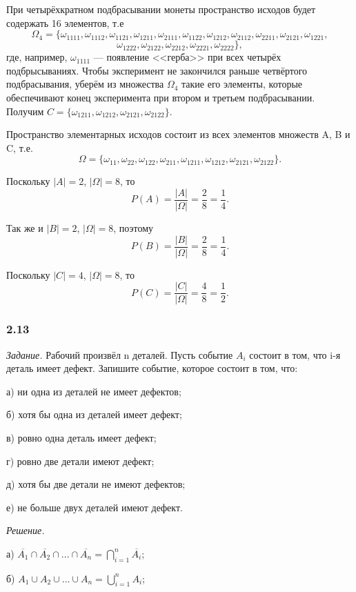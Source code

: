\documentclass{book}
\begin{document}
При четырёхкратном подбрасывании монеты пространство исходов будет содержать 16 элементов, т.е $$\Omega_4=\{\omega_{1111}, \omega_{1112}, \omega_{1121}, \omega_{1211}, \omega_{2111}, \omega_{1122}, \omega_{1212}, \omega_{2112}, \omega_{2211}, \omega_{2121}, \omega_{1221},$$$$\omega_{1222}, \omega_{2122}, \omega_{2212}, \omega_{2221}, \omega_{2222}\},$$ где, например, $\omega_{1111}$ --- появление <<герба>> при всех четырёх подбрысываниях. Чтобы эксперимент не закончился раньше четвёртого подбрасывания, уберём из множества $\Omega_4$ такие его элементы, которые обеспечивают конец эксперимента при втором и третьем подбрасывании. Получим $C=\{\omega_{1211}, \omega_{1212}, \omega_{2121}, \omega_{2122}\}$.

Пространство элементарных исходов состоит из всех элементов множеств A, B и C, т.е. $$\Omega=\{\omega_{11}, \omega_{22}, \omega_{122}, \omega_{211}, \omega_{1211}, \omega_{1212}, \omega_{2121}, \omega_{2122}\}.$$

Поскольку $|A|=2$, $|\Omega|=8$, то $$P(A)=\frac{|A|}{|\Omega|}=\frac{2}{8}=\frac{1}{4}.$$

Так же и $|B|=2$, $|\Omega|=8$, поэтому $$P(B)=\frac{|B|}{|\Omega|}=\frac{2}{8}=\frac{1}{4}.$$

Поскольку $|C|=4$, $|\Omega|=8$, то $$P(C)=\frac{|C|}{|\Omega|}=\frac{4}{8}=\frac{1}{2}.$$

\subsubsection*{2.13}

\textit{Задание.} Рабочий произвёл n деталей. Пусть событие $A_i$ состоит в том, что i-я деталь имеет дефект. Запишите событие, которое состоит в том, что:

а) ни одна из деталей не имеет дефектов;

б) хотя бы одна из деталей имеет дефект;

в) ровно одна деталь имеет дефект;

г) ровно две детали имеют дефект;

д) хотя бы две детали не имеют дефектов;

е) не больше двух деталей имеют дефект.

\textit{Решение.}

а) $\overline{A_1}\cap\overline{A_2}\cap...\cap\overline{A_n}=\bigcap\limits_{i=1}^n\overline{A_i}$;

б) $A_1\cup A_2\cup...\cup A_n=\bigcup\limits_{i=1}^nA_i$;
\end{document}
